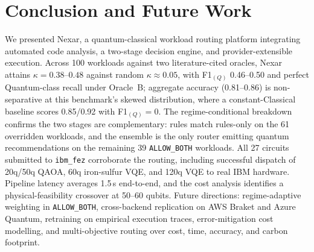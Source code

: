 \documentclass[10pt,conference]{IEEEtran}
\begin{document}
\section{Conclusion and Future Work}\label{sec:future-work}

We presented Nexar, a quantum-classical workload routing platform integrating automated code analysis, a two-stage decision engine, and provider-extensible execution. Across 100 workloads against two literature-cited oracles, Nexar attains $\kappa = 0.38$--$0.48$ against random $\kappa \approx 0.05$, with F1$_{(Q)}$ 0.46--0.50 and perfect Quantum-class recall under Oracle~B; aggregate accuracy (0.81--0.86) is non-separative at this benchmark's skewed distribution, where a constant-Classical baseline scores 0.85/0.92 with F1$_{(Q)}{=}0$. The regime-conditional breakdown confirms the two stages are complementary: rules match rules-only on the 61 overridden workloads, and the ensemble is the only router emitting quantum recommendations on the remaining 39 \texttt{ALLOW\_BOTH} workloads. All 27 circuits submitted to \texttt{ibm\_fez} corroborate the routing, including successful dispatch of 20q/50q QAOA, 60q iron-sulfur VQE, and 120q VQE to real IBM hardware. Pipeline latency averages 1.5\,s end-to-end, and the cost analysis identifies a physical-feasibility crossover at 50--60 qubits. Future directions: regime-adaptive weighting in \texttt{ALLOW\_BOTH}, cross-backend replication on AWS Braket and Azure Quantum, retraining on empirical execution traces, error-mitigation cost modelling, and multi-objective routing over cost, time, accuracy, and carbon footprint.
\end{document}
